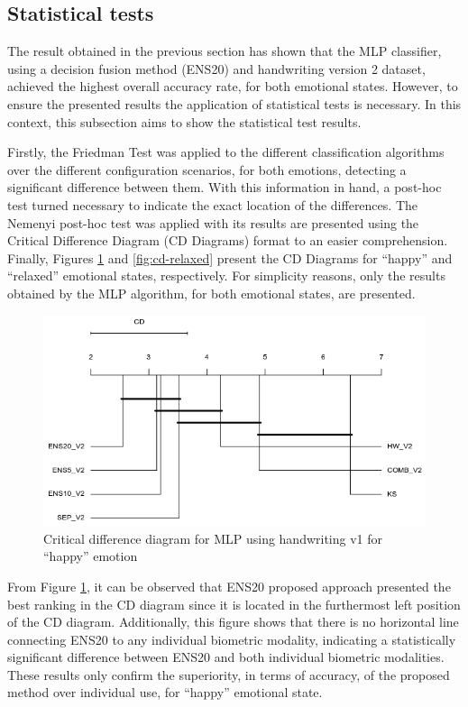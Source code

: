 \documentclass[conference]{IEEEtran}
\begin{document}
\subsection{Statistical tests}

The result obtained in the previous section has shown that the MLP classifier, using a decision fusion method (ENS20) and handwriting version 2 dataset, achieved the highest overall accuracy rate, for both emotional states. However, to ensure the presented results the application of statistical tests is necessary. In this context, this subsection aims to show the statistical test results.

Firstly, the Friedman Test \cite{friedman} was applied to the different classification algorithms over the different configuration scenarios, for both emotions, detecting a significant difference between them. With this information in hand, a post-hoc test turned necessary to indicate the exact location of the differences. 
The Nemenyi \cite{nemenyi} post-hoc test was applied with its results are presented using the Critical Difference Diagram (CD Diagrams) format to an easier comprehension.
Finally, Figures \ref{fig:cd-happy} and \ref{fig:cd-relaxed} present the CD Diagrams for ``happy'' and ``relaxed'' emotional states, respectively. For simplicity reasons, only the results obtained by the MLP algorithm, for both emotional states, are presented.

\begin{figure}[htbp]
  \centering
  \includegraphics[scale=0.5]{images/mlp_v2_happy.png}
  \caption{Critical difference diagram for MLP using handwriting v1 for ``happy'' emotion}
  \label{fig:cd-happy}
\end{figure}

From Figure \ref{fig:cd-happy}, it can be observed that ENS20 proposed approach presented the best ranking in the CD diagram since it is located in the furthermost left position of the CD diagram. Additionally, this figure shows that there is no horizontal line connecting ENS20 to any individual biometric modality, indicating a statistically significant difference between ENS20 and both individual biometric modalities. These results only confirm the superiority, in terms of accuracy, of the proposed method over individual use, for ``happy'' emotional state. 
\end{document}
